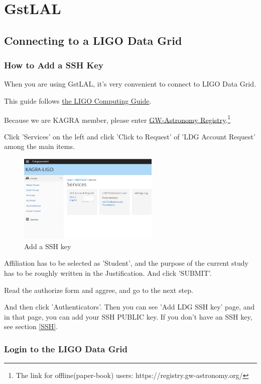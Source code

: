 \section{GstLAL}
\subsection{Connecting to a LIGO Data Grid}
\subsubsection{How to Add a SSH Key}

When you are using GstLAL, it's very convenient to connect to LIGO Data Grid.

This guide follows \href{https://computing.docs.ligo.org/guide/computing-centres/ldg/}{the LIGO Computing Guide}.

Because we are KAGRA member, please enter \href{https://registry.gw-astronomy.org/}{GW-Astronomy Registry}.\footnote{The link for offline(paper-book) users: https://registry.gw-astronomy.org/}

Click 'Services' on the left and click 'Click to Request' of 'LDG Account Request' among the main items.

\begin{figure}[h]
\centering
\includegraphics[width=0.6\textwidth]{figs/profile.png}
\caption{Add a SSH key}
\end{figure}

Affiliation has to be selected as 'Student', and the purpose of the current study has to be roughly written in the Justification. And click 'SUBMIT'.

Read the authorize form and aggree, and go to the next step.

And then click 'Authenticators'. Then you can see 'Add LDG SSH key' page, and in that page, you can add your SSH PUBLIC key. If you don't have an SSH key, see section \ref{SSH}.

\subsubsection{Login to the LIGO Data Grid}

